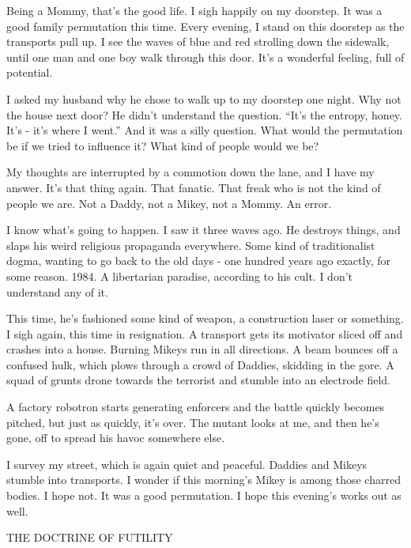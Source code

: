 \documentclass{amsbook}
\begin{document}
Being a Mommy, that's the good life.  I sigh happily on my doorstep.  It was a good family permutation this time.  Every evening, I stand on this doorstep as the transports pull up.  I see the waves of blue and red strolling down the sidewalk, until one man and one boy walk through this door.  It's a wonderful feeling, full of potential.

I asked my husband why he chose to walk up to my doorstep one night. Why not the house next door?  He didn't understand the question.  ``It's the entropy, honey.  It's - it's where I went.''  And it was a silly question.  What would the permutation be if we tried to influence it?  What kind of people would we be?

My thoughts are interrupted by a commotion down the lane, and I have my answer.  It's that thing again.  That fanatic.  That freak who is not the kind of people we are.  Not a Daddy, not a Mikey, not a Mommy.  An error.

I know what's going to happen.  I saw it three waves ago.  He destroys things, and slaps his weird religious propaganda everywhere.  Some kind of traditionalist dogma, wanting to go back to the old days - one hundred years ago exactly, for some reason.  1984.  A libertarian paradise, according to his cult.  I don't understand any of it.

This time, he's fashioned some kind of weapon, a construction laser or something.  I sigh again, this time in resignation.  A transport gets its motivator sliced off and crashes into a house.  Burning Mikeys run in all directions.  A beam bounces off a confused hulk, which plows through a crowd of Daddies, skidding in the gore.  A squad of grunts drone towards the terrorist and stumble into an electrode field.

A factory robotron starts generating enforcers and the battle quickly becomes pitched, but just as quickly, it's over.  The mutant looks at me, and then he's gone, off to spread his havoc somewhere else.

I survey my street, which is again quiet and peaceful.  Daddies and Mikeys stumble into transports.  I wonder if this morning's Mikey is among those charred bodies.  I hope not.  It was a good permutation.  I hope this evening's works out as well.

\clearpage
    {\ROBOFONTx THE DOCTRINE OF FUTILITY}
\vskip 36pt
\end{document}
